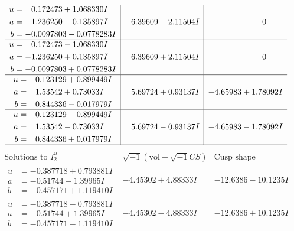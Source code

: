 \documentclass[1p]{elsarticle_modified}
\theoremstyle{definition}
\newcommand{\I}{\sqrt{-1}}
\begin{document}
$$\begin{array}{c|c|c}
\begin{aligned}
u &= \phantom{-}0.172473 + 1.068330 I \\
a &= -1.236250 - 0.135897 I \\
b &= -0.0097803 - 0.0778283 I\end{aligned}
 & \phantom{-}6.39609 - 2.11504 I & \phantom{-0.000000 } 0 \\ \hline\begin{aligned}
u &= \phantom{-}0.172473 - 1.068330 I \\
a &= -1.236250 + 0.135897 I \\
b &= -0.0097803 + 0.0778283 I\end{aligned}
 & \phantom{-}6.39609 + 2.11504 I & \phantom{-0.000000 } 0 \\ \hline\begin{aligned}
u &= \phantom{-}0.123129 + 0.899449 I \\
a &= \phantom{-}1.53542 + 0.73033 I \\
b &= \phantom{-}0.844336 - 0.017979 I\end{aligned}
 & \phantom{-}5.69724 + 0.93137 I & -4.65983 + 1.78092 I \\ \hline\begin{aligned}
u &= \phantom{-}0.123129 - 0.899449 I \\
a &= \phantom{-}1.53542 - 0.73033 I \\
b &= \phantom{-}0.844336 + 0.017979 I\end{aligned}
 & \phantom{-}5.69724 - 0.93137 I & -4.65983 - 1.78092 I\\
 \hline 
 \end{array}$$\newpage$$\begin{array}{c|c|c}  
\text{Solutions to }I^u_{2}& \I (\text{vol} + \sqrt{-1}CS) & \text{Cusp shape}\\
 \hline 
\begin{aligned}
u &= -0.387718 + 0.793881 I \\
a &= -0.51744 - 1.39965 I \\
b &= -0.457171 + 1.119410 I\end{aligned}
 & -4.45302 + 4.88333 I & -12.6386 - 10.1235 I \\ \hline\begin{aligned}
u &= -0.387718 - 0.793881 I \\
a &= -0.51744 + 1.39965 I \\
b &= -0.457171 - 1.119410 I\end{aligned}
 & -4.45302 - 4.88333 I & -12.6386 + 10.1235 I \\ \hline\begin{aligned}

\end{aligned}
\end{array}$$
\end{document}
